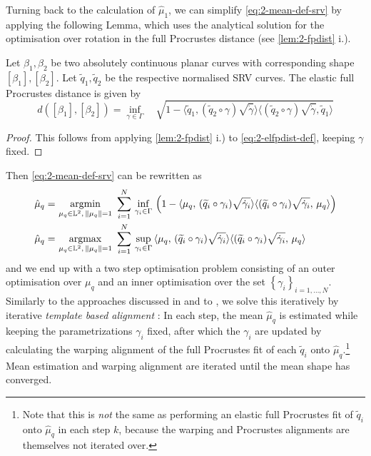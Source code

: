 Turning back to the calculation of $\hat\mu_1$, we can simplify \cref{eq:2-mean-def-srv} by applying the following Lemma, which uses the analytical solution for the optimisation over rotation in the full Procrustes distance (see \cref{lem:2-fpdist} i.). 

\begin{lemma}
  \label{lem:2-elfpdist}
  Let $\beta_1, \beta_2$ be two absolutely continuous planar curves with corresponding shape $[\beta_1], [\beta_2]$. Let $\widetilde q_1, \widetilde q_2$ be the respective normalised SRV curves.
  The elastic full Procrustes distance is given by
  \begin{equation}
    d([\beta_1],[\beta_2]) = \inf_{\gamma \in \Gamma} \quad \sqrt{ 1 - \langle \widetilde q_1, ( \widetilde q_2 \circ \gamma) \sqrt{\dot\gamma} \rangle \langle (\widetilde q_2 \circ \gamma) \sqrt{\dot\gamma}, \widetilde q_1 \rangle }
  \end{equation}
  \begin{proof}
    This follows from applying \cref{lem:2-fpdist} i.) to \cref{eq:2-elfpdist-def}, keeping $\gamma$ fixed.
  \end{proof}
\end{lemma}

\noindent Then \cref{eq:2-mean-def-srv} can be rewritten as
\begin{align}
  \hat\mu_q = &\, \operatorname*{argmin}_{\mu_q \in \mathbb{L}^2,\,\lVert\mu_q\rVert = 1}\,\,
    \sum_{i=1}^N \,\inf_{\gamma_i \in \Gamma}\, \left(1 - \langle \mu_q,\,(\widetilde q_i \circ \gamma_i) \sqrt{\dot\gamma_i} \rangle \langle (\widetilde q_i \circ \gamma_i) \sqrt{\dot\gamma_i},\, \mu_q\rangle \right) \\
  \hat\mu_q = &\, \operatorname*{argmax}_{\mu_q \in \mathbb{L}^2,\,\lVert\mu_q\rVert = 1}\,\,
    \sum_{i=1}^N \,\sup_{\gamma_i \in \Gamma}\, \langle \mu_q,\,(\widetilde q_i \circ \gamma_i) \sqrt{\dot\gamma_i} \rangle \langle (\widetilde q_i \circ \gamma_i) \sqrt{\dot\gamma_i},\, \mu_q\rangle\,
\end{align}
and we end up with a two step optimisation problem consisting of an outer optimisation over $\mu_q$ and an inner optimisation over the set $\left\{\gamma_i\right\}_{i=1,\dots,N}$.
Similarly to the approaches discussed in \cite{SrivastavaKlassen2016} and to \cite{Steyer2021}, we solve this iteratively by iterative \emph{template based alignment} \parencite[see e.g.][271]{SrivastavaKlassen2016}:
In each step, the mean $\hat\mu_q$ is estimated while keeping the parametrizations $\gamma_i$ fixed, after which the $\gamma_i$ are updated by calculating the warping alignment of the full Procrustes fit of each $\widetilde q_i$ onto $\hat\mu_q$.\footnote{Note that this is \emph{not} the same as performing an elastic full Procrustes fit of $\widetilde q_i$ onto $\hat \mu_q$ in each step $k$, because the warping and Procrustes alignments are themselves not iterated over.}
Mean estimation and warping alignment are iterated until the mean shape has converged.

